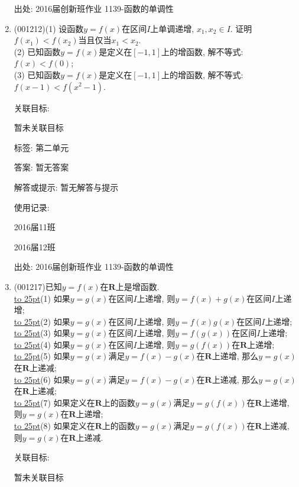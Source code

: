 \documentclass[10pt,a4paper]{article}
\newcommand{\blank}[1]{\underline{\hbox to #1pt{}}}
\begin{document}
\begin{enumerate}[1.]
出处: 2016届创新班作业	1139-函数的单调性
\item { (001212)}(1) 设函数$y=f(x)$在区间$I$上单调递增, $x_1,x_2\in I$. 证明$f(x_1)<f(x_2)$当且仅当$x_1<x_2$.\\ 
(2) 已知函数$y=f(x)$是定义在$[-1,1]$上的增函数, 解不等式: $f(x)<f(0)$;\\ 
(3) 已知函数$y=f(x)$是定义在$[-1,1]$上的增函数, 解不等式: $f(x-1)<f(x^2-1)$.


关联目标:

暂未关联目标



标签: 第二单元

答案: 暂无答案

解答或提示: 暂无解答与提示

使用记录:

2016届11班			

2016届12班			


出处: 2016届创新班作业	1139-函数的单调性
\item { (001217)}已知$y=f(x)$在$\mathbf{R}$上是增函数.\\ 
\blank{25}(1) 如果$y=g(x)$在区间$I$上递增, 则$y=f(x)+g(x)$在区间$I$上递增;\\ 
\blank{25}(2) 如果$y=g(x)$在区间$I$上递增, 则$y=f(x)g(x)$在区间$I$上递增;\\ 
\blank{25}(3) 如果$y=g(x)$在区间$I$上递增, 则$y=f(g(x))$在区间$I$上递增;\\ 
\blank{25}(4) 如果$y=g(x)$在区间$I$上递增, 则$y=g(f(x))$在$\mathbf{R}$上递增;\\ 
\blank{25}(5) 如果$y=g(x)$满足$y=f(x)-g(x)$在$\mathbf{R}$上递增, 那么$y=g(x)$在$\mathbf{R}$上递减;\\ 
\blank{25}(6) 如果$y=g(x)$满足$y=f(x)-g(x)$在$\mathbf{R}$上递减, 那么$y=g(x)$在$\mathbf{R}$上递减;\\ 
\blank{25}(7) 如果定义在$\mathbf{R}$上的函数$y=g(x)$满足$y=g(f(x))$在$\mathbf{R}$上递增, 则$y=g(x)$在$\mathbf{R}$上递增;\\ 
\blank{25}(8) 如果定义在$\mathbf{R}$上的函数$y=g(x)$满足$y=g(f(x))$在$\mathbf{R}$上递减, 则$y=g(x)$在$\mathbf{R}$上递减.


关联目标:

暂未关联目标




\end{enumerate}
\end{document}
